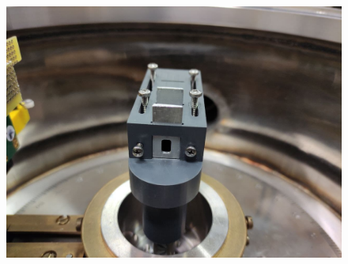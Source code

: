 \documentclass[../../main/main.tex]{subfiles}
\begin{document}
\begin{figure}[h]
\begin{minipage}[c]{0.33\linewidth}
{            \includegraphics[width=\textwidth]{../sections/02/images/apparatus/source_support.jpg}%
            \label{fig:mechanical_source_support}%
        }%
    \end{minipage}%
    \hfill%
    \begin{minipage}[c]{0.33\linewidth}
        \vspace{0pt}
        \centering
    \end{minipage}%


\end{figure}
\end{document}
